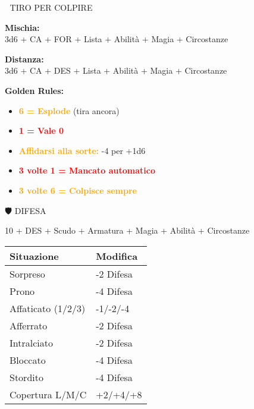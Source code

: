 \documentclass[10pt,a4paper,landscape]{article}
\newcommand{\highlight}[1]{\textcolor{orange}{\textbf{#1}}}
\newcommand{\critical}[1]{\textcolor{red}{\textbf{#1}}}
\begin{document}
\begin{multicols}{4}
		\begin{mainsection}{🎯 TIRO PER COLPIRE}
			\begin{formula}
				\textbf{Mischia:}\\
				3d6 + CA + FOR + Lista + Abilità + Magia + Circostanze
			\end{formula}
			
			\begin{formula}
				\textbf{Distanza:}\\
				3d6 + CA + DES + Lista + Abilità + Magia + Circostanze
			\end{formula}
			
			\textbf{Golden Rules:}
			\begin{itemize}[noitemsep,leftmargin=8pt]
				\item \highlight{6 = Esplode} (tira ancora)
				\item \critical{1 = Vale 0}
				\item \highlight{Affidarsi alla sorte:} -4 per +1d6
				\item \critical{3 volte 1 = Mancato automatico}
				\item \highlight{3 volte 6 = Colpisce sempre}
			\end{itemize}
		\end{mainsection}
		
		\begin{mainsection}{🛡️ DIFESA}
			\begin{formula}
				10 + DES + Scudo + Armatura + Magia + Abilità + Circostanze
			\end{formula}
			
			\begin{tabular}{@{}ll@{}}
				\toprule
				\textbf{Situazione} & \textbf{Modifica} \\
				\midrule
				Sorpreso & -2 Difesa \\
				Prono & -4 Difesa \\
				Affaticato (1/2/3) & -1/-2/-4 \\
				Afferrato & -2 Difesa \\
				Intralciato & -2 Difesa \\
				Bloccato & -4 Difesa \\
				Stordito & -4 Difesa \\
				Copertura L/M/C & +2/+4/+8 \\
				\bottomrule
			\end{tabular}
		\end{mainsection}
		

\end{multicols}
\end{document}
